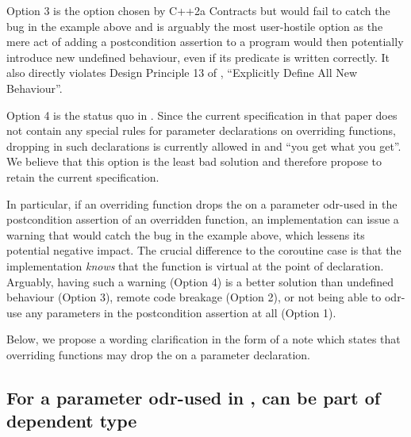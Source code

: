Option 3 is the option chosen by C++2a Contracts \cite{P0542R5} but would fail to catch the bug in the example above and is arguably the most user-hostile option as the mere act of adding a postcondition assertion to a program would then potentially introduce new undefined behaviour, even if its predicate is written correctly. It also directly violates Design Principle 13 of \cite{P2900R10}, ``Explicitly Define All New Behaviour''.

Option 4 is the status quo in \cite{P2900R10}. Since the current specification in that paper does not contain any special rules for parameter declarations on overriding functions, dropping  in such declarations is currently allowed in \cite{P2900R10} and ``you get what you get''. We believe that this option is the least bad solution and therefore propose to retain the current specification.

In particular, if an overriding function drops the  on a parameter odr-used in the postcondition assertion of an overridden function, an implementation can issue a warning that would catch the bug in the example above, which lessens its potential negative impact. The crucial difference to the coroutine case is that the implementation \emph{knows} that the function is virtual at the point of declaration. Arguably, having such a warning (Option 4) is a better solution than undefined behaviour (Option 3), remote code breakage (Option 2), or not being able to odr-use any parameters in the postcondition assertion at all (Option 1).

Below, we propose a wording clarification in the form of a note which states that overriding functions may drop the  on a parameter declaration.

\subsection{For a parameter odr-used in ,  can be part of dependent type}


